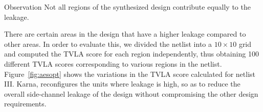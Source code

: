 


\begin{namedthm}{Observation }
Not all regions of the synthesized design contribute equally to the leakage.
\end{namedthm}
{\flushleft There} are certain areas in the design that have a higher leakage compared to other areas. In order to evaluate this, we divided the netlist into a $10 \times 10$ grid and computed the TVLA score for each region independently, thus obtaining 100 different TVLA scores corresponding to various regions in the  netlist. Figure~\ref{fig:aesopt} shows the variations in the TVLA score calculated for netlist III. 
{\sf Karna}, reconfigures the units where leakage is high, so as to reduce the overall side-channel leakage of the design without compromising the other design requirements. 


